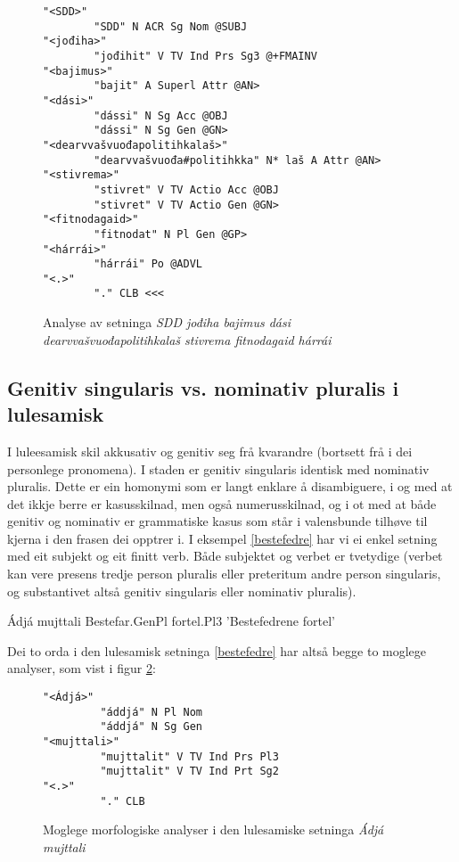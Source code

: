 \documentclass[a4paper,norsk]{article}
\begin{document}
\begin{figure}[htbp]
\begin{center}
\begin{verbatim}
"<SDD>"
        "SDD" N ACR Sg Nom @SUBJ
"<jođiha>"
        "jođihit" V TV Ind Prs Sg3 @+FMAINV
"<bajimus>"
        "bajit" A Superl Attr @AN>
"<dási>"
        "dássi" N Sg Acc @OBJ
        "dássi" N Sg Gen @GN>
"<dearvvašvuođapolitihkalaš>"
        "dearvvašvuođa#politihkka" N* laš A Attr @AN>
"<stivrema>"
        "stivret" V TV Actio Acc @OBJ
        "stivret" V TV Actio Gen @GN>
"<fitnodagaid>"
        "fitnodat" N Pl Gen @GP>
"<hárrái>"
        "hárrái" Po @ADVL
"<.>"
        "." CLB <<<
\end{verbatim}
\caption{Analyse av setninga \textit{SDD jođiha bajimus dási dearvvašvuođapolitihkalaš stivrema fitnodagaid hárrái}}
\label{SDD2-a}
\end{center}
\end{figure}



\subsection{Genitiv singularis vs. nominativ pluralis i lulesamisk}

I luleesamisk skil akkusativ og genitiv seg frå kvarandre (bortsett frå i dei personlege pronomena). I staden er genitiv singularis identisk med nominativ pluralis. Dette er ein homonymi som er langt enklare å disambiguere, i og med at det ikkje berre er kasusskilnad, men også numerusskilnad, og i ot med at både genitiv og nominativ er  grammatiske kasus som står i valensbunde tilhøve til kjerna i den frasen dei opptrer i. I eksempel \ref{bestefedre} har vi ei enkel setning med eit subjekt og eit finitt verb. Både subjektet og verbet er tvetydige (verbet kan vere presens tredje person pluralis eller preteritum andre person singularis, og substantivet altså genitiv singularis eller nominativ pluralis). %

\begin{example}\label{bestefedre}
\gll Ádjá mujttali
    Bestefar.GenPl fortel.Pl3
\glt 'Bestefedrene fortel'    
\glend
\end{example}%

Dei to orda i den lulesamisk setninga \ref{bestefedre} har altså begge to moglege analyser, som vist i figur \ref{am-multi}:

\begin{figure}[htbp]
\begin{center}
\begin{verbatim}
"<Ádjá>"
         "áddjá" N Pl Nom
         "áddjá" N Sg Gen
"<mujttali>"
         "mujttalit" V TV Ind Prs Pl3
         "mujttalit" V TV Ind Prt Sg2
"<.>"
         "." CLB
\end{verbatim}
\caption{Moglege morfologiske analyser i den lulesamiske setninga \textit{Ádjá mujttali}}
\label{am-multi}
\end{center}
\end{figure}
\end{document}
